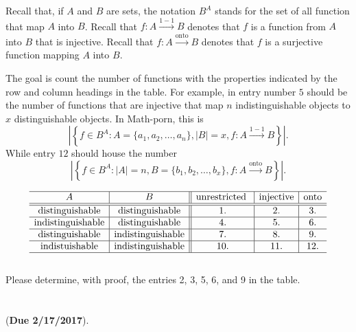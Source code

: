 \documentclass[10pt, AMS Euler]{article}
\begin{document}
Recall that, if $A$ and $B$ are sets, the notation $B^A$ stands for the set of all function that map $A$ into $B$.
Recall that $f:A \stackrel{1-1}{\longrightarrow} B$ denotes that $f$ is a function from $A$ into $B$ that is injective.
Recall that $f:A \stackrel{\mbox{onto}}{\longrightarrow} B$ denotes that $f$ is a surjective function mapping $A$ into $B$.

The goal is count the number of functions with the properties indicated by the row and column headings in the table.
For example, in entry number $5$ should be the number of functions that are injective that map $n$ indistinguishable objects to $x$ distinguishable objects.
In Math-porn, this is
$$\left|\left\{f \in B^A : A=\{a_1,a_2, \dots, a_n\}, |B| = x, f:A \stackrel{1-1}{\longrightarrow} B  \right\} \right|.$$
While entry $12$ should house the number
$$\left|\left\{f \in B^A : |A|=n, B =\{b_1,b_2, \dots, b_x\}, f:A \stackrel{\mbox{onto}}{\longrightarrow} B  \right\} \right|.$$

$$\begin{array}{c|c||c|c|c}
\hline A & B & \mbox{unrestricted }& \mbox{injective}& \mbox{onto} \\ \hline \hline
\mbox{distinguishable} & \mbox{distinguishable} & 1. & 2. & 3. \\ \hline
\mbox{indistinguishable}& \mbox{distinguishable}&4.&5.&6. \\ \hline
\mbox{distinguishable} & \mbox{indistinguishable}& 7. & 8. & 9. \\ \hline
\mbox{indistuishable}&\mbox{indistinguishable}& 10. &11.&12. \\ \hline \end{array}$$\\

\noindent Please determine, with proof, the entries 2, 3, 5, 6, and 9 in the table.\\

\noindent \underline{\hspace{3in}}\\


\noindent \underline{\hspace{3in}}\\

 ({\bf Due 2/17/2017}).\\
\end{document}
